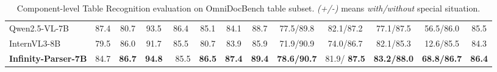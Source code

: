 \begin{table}[h]
{\begin{tabular}{l|ccc|cccc|cccc|c}
    Qwen2.5-VL-7B~\citep{wang2024qwen2} & 87.4 & 80.7 & 93.5 & 86.4 & 85.1 & 84.1 & 88.7 & 77.5/89.8 & 82.1/87.2 & 77.1/87.5 & 56.5/86.0 & 85.5 \\
    InternVL3-8B~\citep{zhu2025internvl3} & 79.5 & 86.0 & 91.7 & 85.5 & 80.7 & 83.9 & 85.9 & 71.9/90.9 & 74.0/86.7 & 82.1/85.3 & 12.6/85.5 & 84.3 \\
    \midrule
    \textbf{Infinity-Parser-7B} & 84.7 & \textbf{86.7} & \textbf{94.8} & \ 85.5 & \textbf{86.5 }& \textbf{87.4} & \textbf{89.4} & \textbf{78.6/90.7} & 81.9/ \textbf{87.5} & \textbf{83.2/88.0} & \textbf{68.8/86.7} & \textbf{86.4} \\
    \bottomrule
    \end{tabular}%
  }
  \caption{Component-level Table Recognition evaluation on OmniDocBench table subset. \textit{(+/-)} means \textit{with/without} special situation. }
  \label{tab:table_single_attr}%
\end{table}











